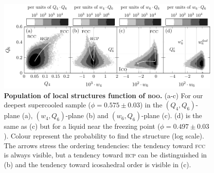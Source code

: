 \begin{figure}
\begin{center}
\includegraphics{generate_figures-figure2.pdf}
\end{center}
\caption{{\bf Population of local structures function of \textsc{boo}.} (a-c) For our deepest supercooled sample ($\phi=0.575\pm 0.03$) in the $(Q_4,Q_6)$-plane (a), $(w_4,Q_6)$-plane (b) and $(w_6,Q_6)$-plane (c). (d) is the same as (c) but for a liquid near the freezing point ($\phi = 0.497 \pm 0.03$). Colour represent the probability to find the structure (log scale). The arrows stress the ordering tendencies: the tendency toward \textsc{fcc} is always visible, but a tendency toward \textsc{hcp} can be distinguished in (b) and the tendency toward icosahedral order is visible in (c).}
	\label{fig:maps}
\end{figure}

\clearpage

